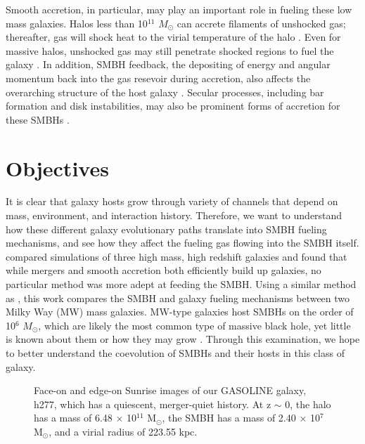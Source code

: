 \documentclass[12pt,headA,chapB]{fiskthesis}
\begin{document}
Smooth accretion, in particular, may play an important role in fueling these low mass galaxies. Halos less than 10$^{11}$ $M_{\odot}$ can accrete filaments of unshocked gas; thereafter, gas will shock heat to the virial temperature of the halo \citep{Keres2005}. Even for massive halos, unshocked gas may still penetrate shocked regions to fuel the galaxy \citep{Brooks2007,Dekel2009,Nelson2013}. In addition, SMBH feedback, the depositing of energy and angular momentum back into the gas resevoir during accretion, also affects the overarching structure of the host galaxy \citep{Governato2009a}. Secular processes, including bar formation and disk instabilities, may also be prominent forms of accretion for these SMBHs \citep{Kormendy2013}. 

\section{Objectives}
It is clear that galaxy hosts grow through variety of channels that depend on mass, environment, and interaction history. Therefore, we want to understand how these different galaxy evolutionary paths translate into SMBH fueling mechanisms, and see how they affect the fueling gas flowing into the SMBH itself. \cite{Bellovary2013} compared simulations of three high mass, high redshift galaxies and found that while mergers and smooth accretion both efficiently build up galaxies, no particular method was more adept at feeding the SMBH. Using a similar method as \cite{Bellovary2013}, this work compares the SMBH and galaxy fueling mechanisms between two Milky Way (MW) mass galaxies. MW-type galaxies host SMBHs on the order of 10$^6$ $M_{\odot}$, which are likely the most common type of massive black hole, yet little is known about them or how they may grow \citep{Kormendy2013}. Through this examination, we hope to better understand the coevolution of SMBHs and their hosts in this class of galaxy. 

\begin{figure}[h]
\centerline{}
\caption[GASOLINE h277]{Face-on and edge-on Sunrise images of our GASOLINE galaxy, h277, which has a quiescent, merger-quiet history. At z $\sim$ 0, the halo has a mass of 6.48 $\times$ 10$^{11}$ M$_{\odot}$, the SMBH has a mass of 2.40 $\times$ 10$^7$ M$_{\odot}$, and a virial radius of 223.55 kpc. }
\label{h277face} 
\end{figure}
\end{document}
